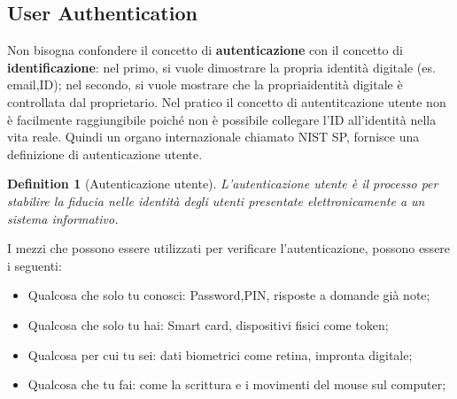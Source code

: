 \documentclass{article}
\newtheorem{definition}{Definition}[section]
\theoremstyle{remark}
\begin{document}
\subsection{User Authentication}
Non bisogna confondere il concetto di \textbf{autenticazione} con il concetto di \textbf{identificazione}: nel primo, si vuole dimostrare la propria identità digitale (es. email,ID); nel secondo, si vuole mostrare che la propriaidentità digitale è controllata dal proprietario.
Nel pratico il concetto di autentitcazione utente non è facilmente raggiungibile poiché non è possibile collegare l'ID all'identità nella vita reale. Quindi un organo internazionale chiamato NIST SP, fornisce una definizione di autenticazione utente.
\begin{definition}[Autenticazione utente]
L'autenticazione utente è il processo per stabilire la fiducia nelle identità degli utenti presentate elettronicamente a un sistema informativo.
\end{definition}
I mezzi che possono essere utilizzati per verificare l'autenticazione, possono essere i seguenti:
\begin{itemize}
    \item Qualcosa che solo tu conosci: Password,PIN, risposte a domande già note;
    \item Qualcosa che solo tu hai: Smart card, dispositivi fisici come token;
    \item Qualcosa per cui tu sei: dati biometrici come retina, impronta digitale;
    \item Qualcosa che tu fai: come la scrittura e i movimenti del mouse sul computer;
\end{itemize}
\end{document}
